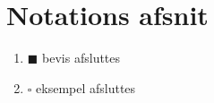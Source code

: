 \chapter*{Notations afsnit}
\begin{enumerate}[\indent {}]
    \item $\blacksquare$ bevis afsluttes
    \item $\square$ eksempel afsluttes
\end{enumerate}